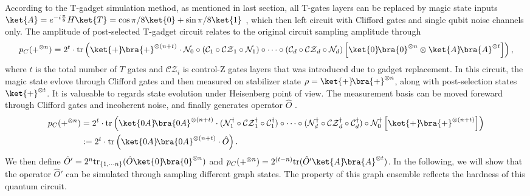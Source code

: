 \documentclass[aps,%
twocolumn,%
floatfix,%
pra,%
amsfonts,%
longbibliography,%
groupedaddress,%
superscriptaddress]{revtex4-2}%
\newcommand{\1}{\mathbbm{1}}
\begin{document}
According to the T-gadget simulation method, as mentioned in last section, all T-gates layers can be replaced by magic state inputs $\ket{A} =e^{-i\frac{\pi}{8}}H\ket{T} = \cos {\pi}/{8}\ket{0} + \sin{ \pi /8} \ket{1}$ , which then left circuit with Clifford gates and single qubit noise channels only. The amplitude of post-selected T-gadget circuit relates to the original circuit sampling amplitude through
\begin{align}
    p_C(+^{\otimes n}) = 2^{t} \cdot \text{tr}\left(\ket{+}\!\bra{+}^{\otimes (n+t)} \cdot\mathcal{N}_0  \circ (\mathcal{C}_1\circ \mathcal{CZ}_1 \circ\mathcal{N}_1)\circ \cdots\circ(\mathcal{C}_d\circ \mathcal{CZ}_d \circ \mathcal{N}_d)\left[\ket{0}\!\bra{0}^{\otimes n}  \otimes \ket{A}\!\bra{A}^{\otimes t} \right]\right),
\end{align}
where $t$ is the total number of $T$ gates and $\mathcal{CZ}_i$ is control-Z gates layers that was introduced due to gadget replacement. 
In this circuit, the magic state evlove through Clifford gates and then measured on stabilizer state $\rho=\ket{+}\!\bra{+}^{\otimes n}$, along with post-selection states $\ket{+}^{\otimes t}$.
It is valueable to regards state evolution under Heisenberg point of view. The measurement basis can be moved foreward through Clifford gates and incoherent noise, and finally generates operator $\hat O$ .
\begin{align}
\label{eq:conjugated_amplitude}
    p_C(+^{\otimes n})   &= 2^{t} \cdot \text{tr}\left(\ket{0A}\!\bra{0A}^{\otimes (n+t)}  \cdot (\mathcal{N}_1^\dagger\circ \mathcal{CZ}_1^\dagger\circ \mathcal{C}_1^\dagger)\circ \cdots\circ(\mathcal{N}_d^\dagger\circ \mathcal{CZ}_d^\dagger\circ \mathcal{C}_d^\dagger)\circ \mathcal{N}_0^\dagger\left[ \ket{+}\!\bra{+}^{\otimes (n+t)} \right]\right)\\
    &:=2^{t} \cdot \text{tr}\left(\ket{0A}\!\bra{0A}^{\otimes (n+t)}  \cdot \hat O\right).
\end{align}
We then define $\hat O' = 2^{n}\text{tr}_{\{1,\cdots n\}} (\hat O \ket{0}\!\bra{0}^{\otimes n})$ and $p_C(+^{\otimes n}) = 2^{(t-n)}\text{tr}(\hat O ' \ket{A}\!\bra{A}^{\otimes t})$. In the following, we will show that the operator $\hat O'$ can be simulated through sampling different graph states. The property of this graph ensemble reflects the hardness of this quantum circuit.
\end{document}
